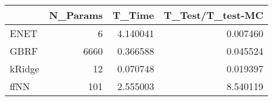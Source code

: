 \begin{tabular}{lrrr}
\toprule
{} &  N\_Params &    T\_Time &  T\_Test/T\_test-MC \\
\midrule
ENET   &         6 &  4.140041 &          0.007460 \\
GBRF   &      6660 &  0.366588 &          0.045524 \\
kRidge &        12 &  0.070748 &          0.019397 \\
ffNN   &       101 &  2.555003 &          8.540119 \\
\bottomrule
\end{tabular}
